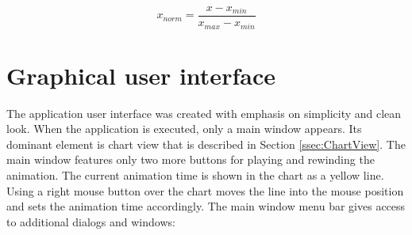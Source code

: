 \begin{equation}
\label{eq:xNorm}
x_{norm} = \frac{x - x_{min}}{x_{max} - x_{min}}
\end{equation}

\section{Graphical user interface}
\label{sec:GUI}
The application user interface was created with emphasis on simplicity and clean look. When the application is executed, only a main window appears. Its dominant element is chart view that is described in Section \ref{ssec:ChartView}. The main window features only two more buttons for playing and rewinding the animation. The current animation time is shown in the chart as a yellow line. Using a right mouse button over the chart moves the line into the mouse position and sets the animation time accordingly. The main window menu bar gives access to additional dialogs and windows:


